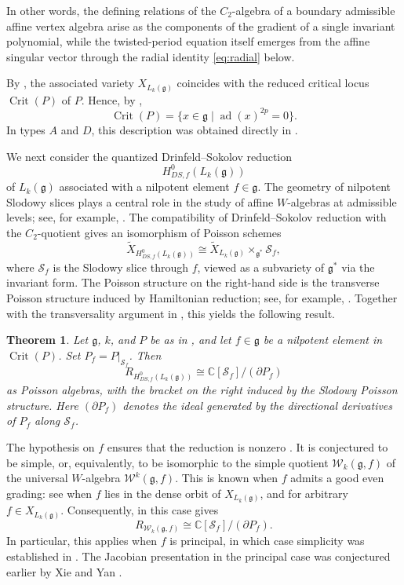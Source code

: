 \documentclass[11pt,reqno]{amsart}
\newtheorem{theorem}{Theorem}
\theoremstyle{remark}
\newcommand{\g}{\mathfrak g}
\newcommand{\C}{\mathbb C}
\newcommand{\on}{\operatorname}
\newcommand{\W}{\mathscr{W}}
\begin{document}
In other words, the defining relations of the $C_2$-algebra of a
boundary admissible affine vertex algebra arise as the components of the gradient of a single
invariant polynomial, while the twisted-period equation itself emerges
from the affine singular vector through the radial identity
\eqref{eq:radial} below.

By , the associated variety $X_{L_k(\g)}$ coincides
with the reduced critical locus $\on{Crit}(P)$ of $P$. Hence, by \cite{Ara},
\[
\on{Crit}(P)=\{x\in\g\mid \on{ad}(x)^{2p}=0\}.
\]
In types $A$ and $D$, this description was obtained directly in
\cite[Theorem~1.2]{Kang}.


We next consider the quantized Drinfeld--Sokolov reduction
\cite{FF,KRW}
\[
H_{DS,f}^0(L_k(\mathfrak g))
\]
of $L_k(\mathfrak g)$ associated with a nilpotent element
$f\in\mathfrak g$.
The geometry of nilpotent Slodowy slices plays a central role in the
study of affine $W$-algebras at admissible levels; see, for example,
\cite{AvEM}. The compatibility of Drinfeld--Sokolov reduction with
the $C_2$-quotient \cite[Corollary~4.5.10 and Theorem~4.6.1]{Ara}
gives an isomorphism of Poisson schemes
\begin{equation}\label{eq:DS-scheme}
\widetilde{X}_{H_{DS,f}^0(L_k(\g))}
\cong
\widetilde{X}_{L_k(\g)}\times_{\g^*}\mathcal S_f,
\end{equation}
where $\mathcal S_f$ is the Slodowy slice through $f$, viewed as a
subvariety of $\g^*$ via the invariant form. The Poisson structure on
the right-hand side is the transverse Poisson structure induced by
Hamiltonian reduction; see, for example, \cite{GG}. Together with the
transversality argument in , this yields the following
result.

\begin{theorem}\label{th:main2}
Let $\g$, $k$, and $P$ be as in , and let
$f\in\g$ be a nilpotent element in $\operatorname{Crit}(P)$.
Set $P_f=P|_{\mathcal S_f}$. Then
\[
R_{H_{DS,f}^0(L_k(\g))}
\cong
\C[\mathcal S_f]/(\partial P_f)
\]
as Poisson algebras, with the bracket on the right induced by the
Slodowy Poisson structure. Here $(\partial P_f)$ denotes the ideal
generated by the directional derivatives of $P_f$ along
$\mathcal S_f$.
\end{theorem}

The hypothesis on $f$ ensures that the reduction is nonzero
\cite[Proposition~4.6.2]{Ara}. It is conjectured to be simple, or,
equivalently, to be isomorphic to the simple quotient $\W_k(\g,f)$
of the universal $W$-algebra $\W^k(\g,f)$. This is known when
$f$ admits a good even grading: see \cite[Theorem~7.8]{AvE} when
$f$ lies in the dense orbit of $X_{L_k(\g)}$, and
\cite[Theorem~10.1]{ACF} for arbitrary $f\in X_{L_k(\g)}$.
Consequently, in this case  gives
\[
R_{\W_k(\g,f)}
\cong
\C[\mathcal S_f]/(\partial P_f).
\]
In particular, this applies when $f$ is principal, in which case
simplicity was established in \cite{A}. The Jacobian presentation in
the principal case was conjectured earlier by Xie and Yan \cite{XY}.
\end{document}
